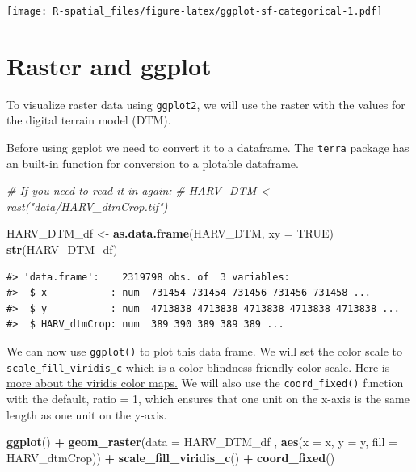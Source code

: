 \documentclass[
]{book}
\newenvironment{Shaded}{\begin{snugshade}}{\end{snugshade}}
\newcommand{\AttributeTok}[1]{\textcolor[rgb]{0.13,0.29,0.53}{#1}}
\newcommand{\CommentTok}[1]{\textcolor[rgb]{0.56,0.35,0.01}{\textit{#1}}}
\newcommand{\ConstantTok}[1]{\textcolor[rgb]{0.56,0.35,0.01}{#1}}
\newcommand{\FunctionTok}[1]{\textcolor[rgb]{0.13,0.29,0.53}{\textbf{#1}}}
\newcommand{\NormalTok}[1]{#1}
\newcommand{\OtherTok}[1]{\textcolor[rgb]{0.56,0.35,0.01}{#1}}
\newcommand{\SpecialCharTok}[1]{\textcolor[rgb]{0.81,0.36,0.00}{\textbf{#1}}}
\begin{document}
\texttt{[image: R-spatial\_files/figure-latex/ggplot-sf-categorical-1.pdf]}

\hypertarget{raster-and-ggplot}{%
\section{Raster and ggplot}\label{raster-and-ggplot}}

To visualize raster data using \texttt{ggplot2}, we will use the raster with the values for the digital terrain model (DTM).

Before using ggplot we need to convert it to a dataframe. The \texttt{terra} package has an built-in function for conversion to a plotable dataframe.

\begin{Shaded}
\begin{Highlighting}[]
\CommentTok{\# If you need to read it in again:}
\CommentTok{\# HARV\_DTM \textless{}{-} rast("data/HARV\_dtmCrop.tif")}

\NormalTok{HARV\_DTM\_df }\OtherTok{\textless{}{-}} \FunctionTok{as.data.frame}\NormalTok{(HARV\_DTM, }\AttributeTok{xy =} \ConstantTok{TRUE}\NormalTok{)}
\FunctionTok{str}\NormalTok{(HARV\_DTM\_df)}
\end{Highlighting}
\end{Shaded}

\begin{verbatim}
#> 'data.frame':    2319798 obs. of  3 variables:
#>  $ x           : num  731454 731454 731456 731456 731458 ...
#>  $ y           : num  4713838 4713838 4713838 4713838 4713838 ...
#>  $ HARV_dtmCrop: num  389 390 389 389 389 ...
\end{verbatim}

We can now use \texttt{ggplot()} to plot this data frame. We will set the color scale to \texttt{scale\_fill\_viridis\_c} which is a color-blindness friendly color scale. \href{https://cran.r-project.org/web/packages/viridis/vignettes/intro-to-viridis.html}{Here is more about the viridis color maps.} We will also use the \texttt{coord\_fixed()} function with the default, ratio = 1, which ensures that one unit on the x-axis is the same length as one unit on the y-axis.

\begin{Shaded}
\begin{Highlighting}[]
\FunctionTok{ggplot}\NormalTok{() }\SpecialCharTok{+}
    \FunctionTok{geom\_raster}\NormalTok{(}\AttributeTok{data =}\NormalTok{ HARV\_DTM\_df , }\FunctionTok{aes}\NormalTok{(}\AttributeTok{x =}\NormalTok{ x, }\AttributeTok{y =}\NormalTok{ y, }\AttributeTok{fill =}\NormalTok{ HARV\_dtmCrop)) }\SpecialCharTok{+}
    \FunctionTok{scale\_fill\_viridis\_c}\NormalTok{() }\SpecialCharTok{+}
    \FunctionTok{coord\_fixed}\NormalTok{()}
\end{Highlighting}
\end{Shaded}
\end{document}
